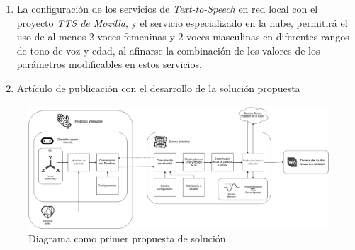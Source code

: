 \begin{enumerate}
	\item La configuración de los servicios de \textit{Text-to-Speech} en red local con el proyecto \textit{TTS de Mozilla}, y el servicio especializado en la nube, permitirá el uso de al menos 2 voces femeninas y 2 voces masculinas en diferentes rangos de tono de voz y edad, al afinarse la combinación de los valores de los parámetros modificables en estos servicios.
	
	\item Artículo de publicación con el desarrollo de la solución propuesta
\end{enumerate}

\begin{figure}[!h]
	\centering
	\includegraphics[width=16cm]{Imagenes/Diagrama.png}
	\caption{Diagrama como primer propuesta de solución}
	\label{Diagrama}
\end{figure}
